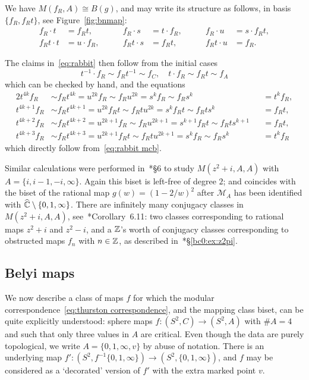 \documentclass{amsart}
\begin{document}
We have $M(f_R,A)\cong B(g)$, and may write its structure as follows,
in basis $\{f_R,f_R t\}$, see Figure~\ref{fig:bnmap}:
\begin{equation}\label{eq:rabbit mcb}
  \begin{alignedat}{3}
    f_R\cdot t&=f_R t,\qquad & f_R\cdot s&=t\cdot f_R,\qquad & f_R\cdot u&=s\cdot f_R t,\\
    f_R t\cdot t&=u\cdot f_R,\qquad & f_R t\cdot s&=f_R t,\qquad & f_R t\cdot u&=f_R.
  \end{alignedat}
\end{equation}

The claims in~\eqref{eq:rabbit} then follow from the initial cases
\[t^{-1}\cdot f_R\sim f_R t^{-1}\sim f_C,\quad t\cdot f_R\sim f_R t\sim f_A\]
which can be checked by hand, and the equations
\begin{alignat*}{2}
  t^{4k}f_R &\sim f_R t^{4k}=u^{2k}f_R\sim f_R u^{2k}=s^k f_R\sim f_R s^k&&=t^k f_R,\\
  t^{4k+1}f_R &\sim f_R t^{4k+1}=u^{2k}f_R t\sim f_R t u^{2k}=s^k f_R t\sim f_R t s^k&&=f_R t,\\
  t^{4k+2}f_R &\sim f_R t^{4k+2}=u^{2k+1}f_R\sim f_R u^{2k+1}=s^{k+1} f_R t\sim f_R t s^{k+1}&&=f_R t,\\
  t^{4k+3}f_R &\sim f_R t^{4k+3}=u^{2k+1}f_R t\sim f_R t u^{2k+1}=s^k f_R\sim f_R s^k&&=t^k f_R
\end{alignat*}
which directly follow from~\eqref{eq:rabbit mcb}.

Similar calculations were performed
in~\cite{bartholdi-n:thurston}*{\S6} to study
$M(z^2+i,A,A)$ with $A=\{i,i-1,-i,\infty\}$. Again this biset is
left-free of degree $2$; and coincides with the biset of the rational
map $g(w)=(1-2/w)^2$ after $\mathscr M_A$ has been identified with
${\widehat{{\mathbb C}}}\setminus\{0,1,\infty\}$. There are infinitely many conjugacy
classes in $M(z^2+i,A,A)$,
see~\cite{bartholdi-n:thurston}*{Corollary~6.11}: two
classes corresponding to rational maps $z^2+i$ and $z^2-i$, and a
${\mathbb Z}$'s worth of conjugacy classes corresponding to obstructed maps
$f_n$ with $n\in{\mathbb Z}$, as described
in~\cite{bartholdi-dudko:bc0}*{\S\ref{bc0:ex:z2pi}}.

\subsection{Belyi maps}\label{ss:BelyaMaps}
We now describe a class of maps $f$ for which the modular
correspondence~\eqref{eq:thurston correspondence}, and the mapping
class biset, can be quite explicitly understood: sphere maps
$f\colon(S^2,C)\to(S^2,A)$ with $\#A=4$ and such that only three
values in $A$ are critical.  Even though the data are purely
topological, we write $A=\{0,1,\infty,v\}$ by abuse of notation. There
is an underlying map
$f'\colon(S^2,f^{-1}\{0,1,\infty\})\to(S^2,\{0,1,\infty\})$, and $f$
may be considered as a `decorated' version of $f'$ with the extra
marked point $v$.
\end{document}
